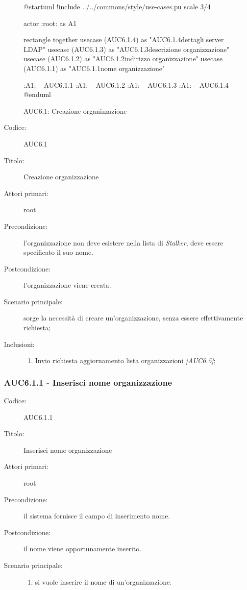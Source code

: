 \documentclass[casi-duso]{subfiles}
\begin{document}
  \begin{figure}[h!]
    \centering
    \begin{plantuml}
    @startuml
    !include ../../commons/style/use-cases.pu
    scale 3/4

    actor :root: as A1

    rectangle {
      together {
        usecase (AUC6.1.4) as "AUC6.1.4\nConfigurazione dettagli server LDAP"
        usecase (AUC6.1.3) as "AUC6.1.3\nInserisci descrizione organizzazione"
        usecase (AUC6.1.2) as "AUC6.1.2\nInserisci indirizzo organizzazione"
        usecase (AUC6.1.1) as "AUC6.1.1\nInserisci nome organizzazione"
      }
    }

    :A1: -- AUC6.1.1
    :A1: -- AUC6.1.2
    :A1: -- AUC6.1.3
    :A1: -- AUC6.1.4
    @enduml
    \end{plantuml}
    \caption{AUC6.1: Creazione organizzazione}
    \label{fig:auc6_1}
  \end{figure}

  \begin{description}
    \item[Codice:] AUC6.1
    \item[Titolo:] Creazione organizzazione
    \item[Attori primari:] root
    \item[Precondizione:] l'organizzazione non deve esistere nella lista di \emph{Stalker}, deve essere specificato il suo nome.
    \item[Postcondizione:] l'organizzazione viene creata.
    \item[Scenario principale:] sorge la necessità di creare un'organizzazione, senza essere effettivamente richiesta;
    \item[Inclusioni:]
    \begin{enumerate}
      \item Invio richiesta aggiornamento lista organizzazioni \emph{[AUC6.5]};
    \end{enumerate}
  \end{description}

  \subsubsection{AUC6.1.1 - Inserisci nome organizzazione}%
  \label{subsub:AUC6.1.1}
  \begin{description}
    \item[Codice:] AUC6.1.1
    \item[Titolo:] Inserisci nome organizzazione
    \item[Attori primari:] root
    \item[Precondizione:] il sistema fornisce il campo di inserimento nome.
    \item[Postcondizione:] il nome viene opportunamente inserito.
    \item[Scenario principale:]
    \begin{enumerate}
      \item si vuole inserire il nome di un'organizzazione.
    \end{enumerate}

  \end{description}
\end{document}
